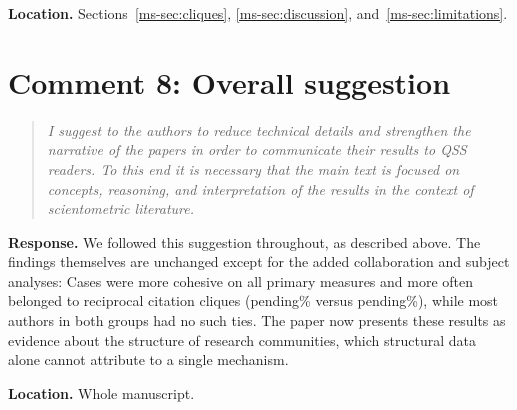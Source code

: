 \documentclass[11pt]{article}
\providecommand{\CliqueCaseMembershipPercent}{pending}
\providecommand{\CliqueControlMembershipPercent}{pending}
\newcommand{\commenttext}[1]{\begin{quote}\itshape #1\end{quote}}
\newcommand{\response}{\textbf{Response.} }
\newcommand{\location}[1]{\textbf{Location.} #1.}
\begin{document}
\location{Sections~\ref{ms-sec:cliques}, \ref{ms-sec:discussion}, and~\ref{ms-sec:limitations}}

\section*{Comment 8: Overall suggestion}

\commenttext{I suggest to the authors to reduce technical details and strengthen the narrative of the papers in order to communicate their results to QSS readers. To this end it is necessary that the main text is focused on concepts, reasoning, and interpretation of the results in the context of scientometric literature.}

\response We followed this suggestion throughout, as described above.  The findings themselves are unchanged except for the added collaboration and subject analyses: Cases were more cohesive on all primary measures and more often belonged to reciprocal citation cliques (\CliqueCaseMembershipPercent\% versus \CliqueControlMembershipPercent\%), while most authors in both groups had no such ties.  The paper now presents these results as evidence about the structure of research communities, which structural data alone cannot attribute to a single mechanism.

\location{Whole manuscript}
\end{document}
